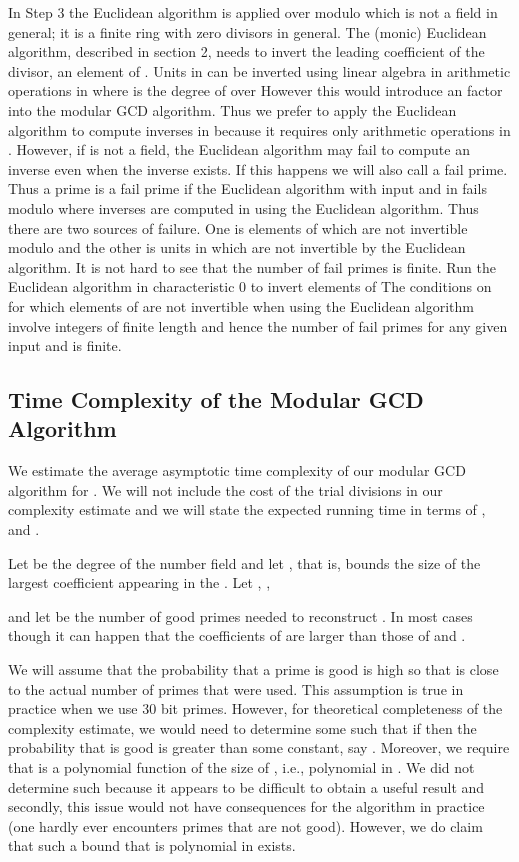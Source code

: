 \documentclass[10pt]{article}
\begin{document}
In Step 3 the Euclidean algorithm is applied over  modulo  which
is not a field in general; it is a finite ring  with zero divisors
in general.  The (monic) Euclidean algorithm, described in section 2,
needs to invert the leading coefficient of the divisor, an element of .
Units in  can be inverted using linear algebra in  arithmetic
operations in  where  is the degree of  over 
However this would introduce an  factor into the modular GCD algorithm.
Thus we prefer to apply the Euclidean algorithm to compute inverses in 
because it requires only  arithmetic operations in .
However, if  is not a field, the Euclidean algorithm may fail
to compute an inverse even when the inverse exists.
If this happens we will also call  a fail prime.
Thus a prime  is a fail prime if the Euclidean algorithm with
input  and  in  fails modulo  where inverses
are computed in  using the Euclidean algorithm.
Thus there are two sources of failure.  One is elements of  which
are not invertible modulo  and the other is units in  which
are not invertible by the Euclidean algorithm.
It is not hard to see that the number of fail primes is finite.
Run the Euclidean algorithm in characteristic 0 to invert
elements of   The conditions on  for which elements
of  are not invertible when using the Euclidean algorithm
involve integers of finite length and hence the number
of fail primes for any given input  and  is finite.

\subsection{Time Complexity of the Modular GCD Algorithm}
We estimate the average asymptotic time complexity of our
modular GCD algorithm for .  We will not include the cost
of the trial divisions in our complexity estimate and we
will state the expected running time in terms of
,  and .

Let  be the degree of the number field  and let
, that is, 
bounds the size of the largest coefficient appearing in the .
Let , ,

and let  be the number of good primes needed to reconstruct .
In most cases  though it can happen that the coefficients
of  are larger than those of  and .

We will assume that the probability that a prime is good is high
so that  is close to the actual number of primes that were used.
This assumption is true in practice when we use 30 bit primes.
However, for theoretical completeness of the complexity estimate,
we would need to determine some  such that
if  then the probability that  is good is greater
than some constant, say .
Moreover, we require that  is a polynomial function
of the size of , i.e., polynomial in .
We did not determine such  because it appears to be difficult
to obtain a useful result and secondly, this issue would
not have consequences for the algorithm in practice (one hardly ever
encounters primes that are not good).
However, we do claim that such a bound that is
polynomial in  exists.
\end{document}
